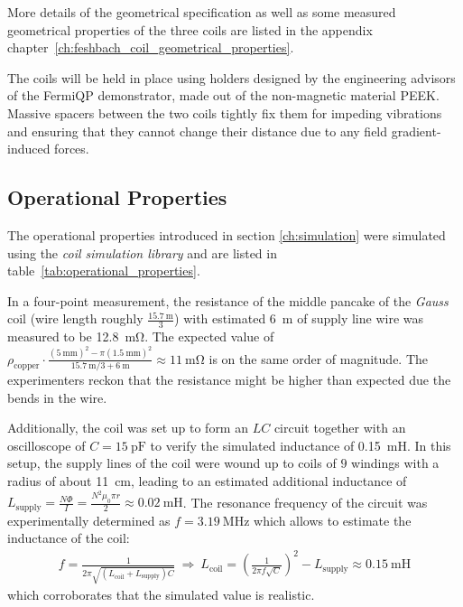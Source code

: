 More details of the geometrical specification as well as some measured geometrical properties of the three coils are listed in the appendix chapter~\ref{ch:feshbach_coil_geometrical_properties}.

The coils will be held in place using holders designed by the engineering advisors of the FermiQP demonstrator, made out of the non-magnetic material PEEK. Massive spacers between the two coils tightly fix them for impeding vibrations and ensuring that they cannot change their distance due to any field gradient-induced forces.

\subsection*{Operational Properties}
The operational properties introduced in section \ref{ch:simulation} were simulated using the \textit{coil simulation library} and are listed in table~\ref{tab:operational_properties}.

In a four-point measurement, the resistance of the middle pancake of the \textit{Gauss} coil (wire length roughly $\frac{\SI{15.7}{\meter}}{3}$) with estimated \SI{6}{\meter} of supply line wire was measured to be \SI{12.8}{\milli\ohm}. The expected value of $\rho_\text{copper} \cdot \frac{(\SI{5}{\milli\meter})^2 - \pi(\SI{1.5}{\milli\meter})^2}{\SI{15.7}{\meter}/3 + \SI{6}{\meter}} \approx \SI{11}{\milli\ohm}$ is on the same order of magnitude. The experimenters reckon that the resistance might be higher than expected due the bends in the wire.

Additionally, the coil was set up to form an $LC$ circuit together with an oscilloscope of $C = \SI{15}{\pico\farad}$ to verify the simulated inductance of \SI{0.15}{\milli\henry}. In this setup, the supply lines of the coil were wound up to coils of $9$ windings with a radius of about \SI{11}{\centi\meter}, leading to an estimated additional inductance of $L_\text{supply} = \frac{N\Phi}{I} = \frac{N^2\mu_0\pi r}{2} \approx \SI{0.02}{\milli\henry}$. The resonance frequency of the circuit was experimentally determined as $f = \SI{3.19}{\mega\hertz}$ which allows to estimate the inductance of the coil:
\begin{align}
    f = \frac{1}{2\pi \sqrt{(L_\text{coil} + L_\text{supply})C}} ~\Rightarrow~ L_\text{coil} = \left(\frac{1}{2\pi f \sqrt{C}}\right)^2 - L_\text{supply} \approx \SI{0.15}{\milli\henry}
\end{align}
which corroborates that the simulated value is realistic.

